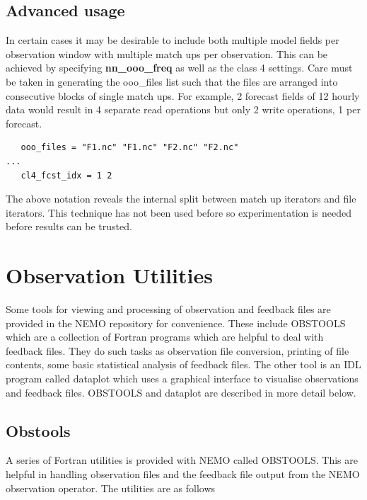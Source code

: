 \subsection{Advanced usage}

In certain cases it may be desirable to include both multiple model fields per
observation window with multiple match ups per observation. This can be achieved
by specifying \textbf{nn\_ooo\_freq} as well as the class 4 settings. Care must
be taken in generating the ooo\_files list such that the files are arranged into
consecutive blocks of single match ups. For example, 2 forecast fields 
of 12 hourly data would result in 4 separate read operations but only 2 write
operations, 1 per forecast.

\begin{alltt}
\tiny
\begin{verbatim}
   ooo_files = "F1.nc" "F1.nc" "F2.nc" "F2.nc"
...
   cl4_fcst_idx = 1 2
\end{verbatim}
\end{alltt}

The above notation reveals the internal split between match up iterators and file
iterators. This technique has not been used before so experimentation is needed
before results can be trusted.




\newpage

\section{Observation Utilities}
\label{OBS_obsutils}

Some tools for viewing and processing of observation and feedback files are provided in the
NEMO repository for convenience. These include OBSTOOLS which are a collection of Fortran
programs which are helpful to deal with feedback files. They do such tasks as observation file
conversion, printing of file contents, some basic statistical analysis of feedback files. The
other tool is an IDL program called dataplot which uses a graphical interface to visualise
observations and feedback files. OBSTOOLS and dataplot are described in more detail below.  

\subsection{Obstools}

A series of Fortran utilities is provided with NEMO called OBSTOOLS. This are helpful in
handling observation files and the feedback file output from the NEMO observation operator.
The utilities are as follows

